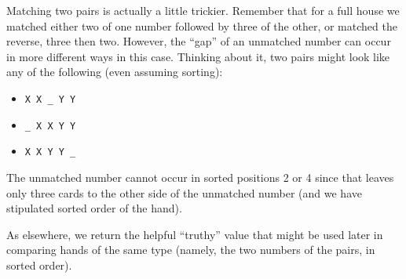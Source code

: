 Matching two pairs is actually a little trickier. Remember that for a
full house we matched either two of one number followed by three of the
other, or matched the reverse, three then two. However, the ``gap'' of
an unmatched number can occur in more different ways in this case.
Thinking about it, two pairs might look like any of the following (even
assuming sorting):

\newpage

\begin{itemize}
\tightlist
\item
  \texttt{X\ X\ \_\ Y\ Y}
\item
  \texttt{\_\ X\ X\ Y\ Y}
\item
  \texttt{X\ X\ Y\ Y\ \_}
\end{itemize}

The unmatched number cannot occur in sorted positions 2 or 4 since that
leaves only three cards to the other side of the unmatched number (and
we have stipulated sorted order of the hand).

As elsewhere, we return the helpful ``truthy'' value that might be used
later in comparing hands of the same type (namely, the two numbers of
the pairs, in sorted order).

